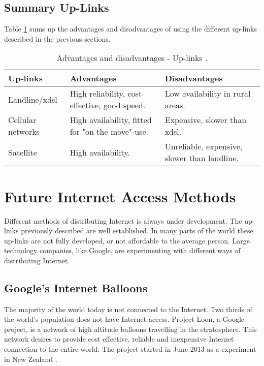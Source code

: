 \subsection{Summary Up-Links}

Table \ref{tab:uplinks} sums up the advantages and disadvantages of using the different up-links described in the previous sections. 

\begin{center}
\begin{table}[!h]
\caption{\label{tab:uplinks}Advantages and disadvantages - Up-links \cite{comparisonuplinks}.}
    \begin{tabular}{ | l | p{4cm} | p{5cm} |}
    \hline
    \textbf{Up-links} & \textbf{Advantages} & \textbf{Disadvantages} \\ 
    \hline
    Landline/x\gls{dsl} & High reliability, cost effective, good speed. & Low availability in rural areas. \\ 
    \hline
     Cellular networks & High availability, fitted for "on the move"-use. & Expensive, slower than x\gls{dsl}.\\
    \hline
    Satellite & High availability.  & Unreliable, expensive, slower than landline.\\ 
    \hline
    \end{tabular}
   \end{table}
\end{center}


\section{Future Internet Access Methods}
Different methods of distributing Internet is always under development. The up-links previously described are well established. In many parts of the world these up-links are not fully developed, or not affordable to the average person. Large technology companies, like Google, are experimenting with different ways of distributing Internet. 

\subsection{Google's Internet Balloons}
The majority of the world today is not connected to the Internet. Two thirds of the world's population does not have Internet access. Project Loon, a Google project, is a network of high altitude balloons travelling in the stratosphere. This network desires to provide cost effective, reliable and inexpensive Internet connection to the entire world. The project started in June 2013 as a experiment in New Zealand \cite{loon}. 

